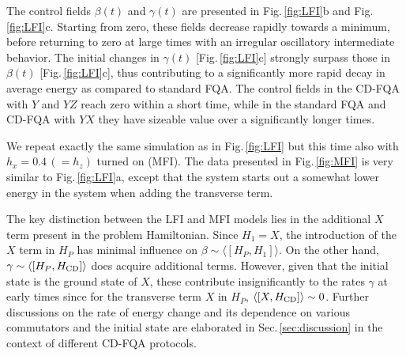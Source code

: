 \documentclass[twocolumn,aps,superscriptaddress,floatfix,longbibliography]{revtex4-2}
\newcommand{\hir}[1]{{\color[rgb]{0.4,0.1,0.6}{#1}}}
\newcommand{\Sec}[1]{Sec.\,\ref{#1}}
\newcommand{\Fig}[1]{Fig.\,\ref{fig:#1}}
\def\YX{\ensuremath{\mathit{YX}}\xspace} %
\def\YZ{\ensuremath{\mathit{YZ}}\xspace}
\def\ZZ{\ensuremath{\mathit{ZZ}}\xspace}
\begin{document}
The control fields $\beta(t)$ and $\gamma(t)$ are presented in
\Fig{LFI}b and \Fig{LFI}c. 
Starting from %
zero, these fields decrease rapidly towards a minimum, before returning to zero at large times
with an irregular oscillatory intermediate behavior.
The initial changes in $\gamma(t)$ [\Fig{LFI}c] strongly
surpass those in $\beta(t)$ [\Fig{LFI}c], thus
contributing to a significantly more rapid decay in average
energy as
compared to standard FQA. 
The control fields in the CD-FQA with
$Y$ and \YZ reach zero within a short time, while in the
standard FQA and CD-FQA with \YX
they have sizeable value over a significantly longer
times.

We repeat exactly the same simulation as in \Fig{LFI}
but this time also with $h_x = 0.4\, (= h_z)$ turned on (MFI).
The data presented in \Fig{MFI} %
is very similar to \Fig{LFI}a,
except that the system starts out a somewhat lower
energy in the system when adding the transverse term.

The key distinction between the LFI and MFI models lies in the
additional $X$ term present in the problem Hamiltonian.
Since $H_1=X$, the introduction of the $X$ term in $H_P$
has minimal influence on $\beta \sim \langle [H_P,H_1]\rangle$.
On the other hand, %
$\gamma\sim \langle [H_P,H_{\rm CD}]\rangle $ %
does acquire %
additional terms. %
However,
given that the initial state is the ground state of $X$,
these %
contribute insignificantly to the rates $\gamma$ at early times
since for the transverse term $X$ in $H_P$,
$\langle[X, H_{\rm CD}]\rangle \sim 0$.
Further discussions on the rate of energy change and its
dependence on various commutators and the initial state are
elaborated in \Sec{sec:discussion} %
in the context of different CD-FQA
protocols.
\end{document}
